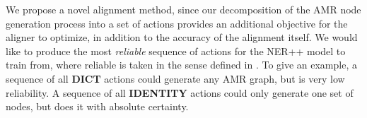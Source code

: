 We propose a novel alignment method, since
  our decomposition of the AMR node generation process into a set of actions 
  provides an additional objective for the aligner to optimize, in addition to the
  accuracy of the alignment itself.
We would like to produce the most \textit{reliable}
  sequence of actions for the NER++ model to train from, where reliable is taken
  in the sense defined in .
To give an example, a sequence of all \textbf{DICT} actions could generate any
  AMR graph, but is very low reliability.
A sequence of all \textbf{IDENTITY} actions could only generate one set of nodes, but does it with absolute certainty.




